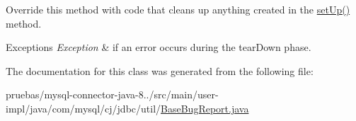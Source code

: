 Override this method with code that cleans up anything created in the \mbox{\hyperlink{classcom_1_1mysql_1_1cj_1_1jdbc_1_1util_1_1_base_bug_report_ad320a1b51efdb6c84a11050708d59d51}{set\+Up()}} method.


\begin{DoxyExceptions}{Exceptions}
{\em Exception} & if an error occurs during the \textquotesingle{}tear\+Down\textquotesingle{} phase. \\
\hline
\end{DoxyExceptions}


The documentation for this class was generated from the following file\+:\begin{DoxyCompactItemize}
\item 
pruebas/mysql-\/connector-\/java-\/8../src/main/user-\/impl/java/com/mysql/cj/jdbc/util/\mbox{\hyperlink{_base_bug_report_8java}{Base\+Bug\+Report.\+java}}\end{DoxyCompactItemize}
